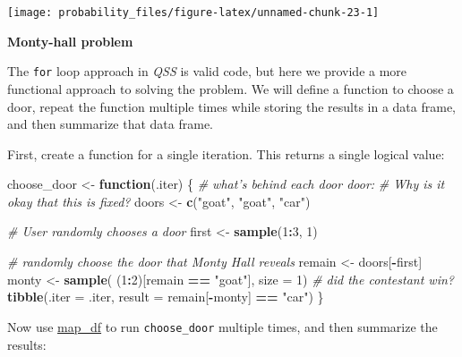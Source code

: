 \documentclass[]{book}
\newenvironment{Shaded}{\begin{snugshade}}{\end{snugshade}}
\newcommand{\CommentTok}[1]{\textcolor[rgb]{0.56,0.35,0.01}{\textit{#1}}}
\newcommand{\ControlFlowTok}[1]{\textcolor[rgb]{0.13,0.29,0.53}{\textbf{#1}}}
\newcommand{\DataTypeTok}[1]{\textcolor[rgb]{0.13,0.29,0.53}{#1}}
\newcommand{\DecValTok}[1]{\textcolor[rgb]{0.00,0.00,0.81}{#1}}
\newcommand{\KeywordTok}[1]{\textcolor[rgb]{0.13,0.29,0.53}{\textbf{#1}}}
\newcommand{\NormalTok}[1]{#1}
\newcommand{\OperatorTok}[1]{\textcolor[rgb]{0.81,0.36,0.00}{\textbf{#1}}}
\newcommand{\StringTok}[1]{\textcolor[rgb]{0.31,0.60,0.02}{#1}}
\theoremstyle{definition}
\theoremstyle{definition}
\theoremstyle{definition}
\theoremstyle{remark}
\begin{document}
\begin{center}\texttt{[image: probability\_files/figure-latex/unnamed-chunk-23-1]} \end{center}

\textbf{Monty-hall problem}

The \texttt{for} loop approach in \emph{QSS} is valid code, but here we
provide a more functional approach to solving the problem. We will
define a function to choose a door, repeat the function multiple times
while storing the results in a data frame, and then summarize that data
frame.

First, create a function for a single iteration. This returns a single
logical value:

\begin{Shaded}
\begin{Highlighting}[]
\NormalTok{choose_door <-}\StringTok{ }\ControlFlowTok{function}\NormalTok{(.iter) \{}
  \CommentTok{# what's behind each door door:}
  \CommentTok{# Why is it okay that this is fixed?}
\NormalTok{  doors <-}\StringTok{ }\KeywordTok{c}\NormalTok{(}\StringTok{"goat"}\NormalTok{, }\StringTok{"goat"}\NormalTok{, }\StringTok{"car"}\NormalTok{)}

  \CommentTok{# User randomly chooses a door}
\NormalTok{  first <-}\StringTok{ }\KeywordTok{sample}\NormalTok{(}\DecValTok{1}\OperatorTok{:}\DecValTok{3}\NormalTok{, }\DecValTok{1}\NormalTok{)}

  \CommentTok{# randomly choose the door that Monty Hall reveals}
\NormalTok{  remain <-}\StringTok{ }\NormalTok{doors[}\OperatorTok{-}\NormalTok{first]}
\NormalTok{  monty <-}\StringTok{ }\KeywordTok{sample}\NormalTok{( (}\DecValTok{1}\OperatorTok{:}\DecValTok{2}\NormalTok{)[remain }\OperatorTok{==}\StringTok{ "goat"}\NormalTok{], }\DataTypeTok{size =} \DecValTok{1}\NormalTok{)}
  \CommentTok{# did the contestant win?}
  \KeywordTok{tibble}\NormalTok{(}\DataTypeTok{.iter =}\NormalTok{ .iter,}
         \DataTypeTok{result =}\NormalTok{ remain[}\OperatorTok{-}\NormalTok{monty] }\OperatorTok{==}\StringTok{ "car"}\NormalTok{)}
\NormalTok{\}}
\end{Highlighting}
\end{Shaded}

Now use
\href{https://www.rdocumentation.org/packages/purrr/topics/map_df}{map\_df}
to run \texttt{choose\_door} multiple times, and then summarize the
results:

\begin{Shaded}
\end{Shaded}
\end{document}
